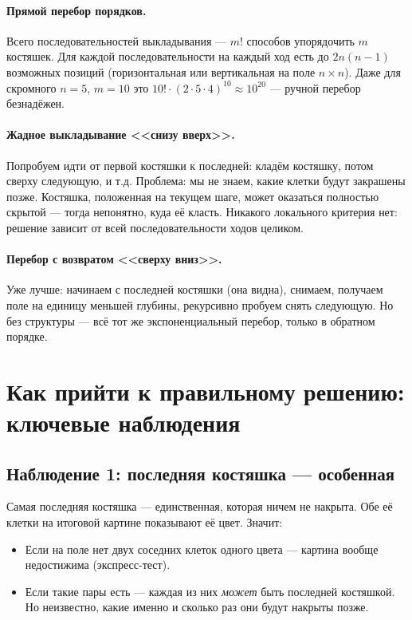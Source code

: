 \documentclass[12pt,a4paper]{article}
\begin{document}
\paragraph{Прямой перебор порядков.}
Всего последовательностей выкладывания --- $m!$ способов упорядочить
$m$ костяшек. Для каждой последовательности на каждый ход есть до
$2n(n-1)$ возможных позиций (горизонтальная или вертикальная на поле
$n\times n$). Даже для скромного $n=5$, $m=10$ это
$10! \cdot (2\cdot5\cdot4)^{10} \approx 10^{20}$ --- ручной перебор
безнадёжен.

\paragraph{Жадное выкладывание <<снизу вверх>>.}
Попробуем идти от первой костяшки к последней: кладём костяшку, потом
сверху следующую, и т.д. Проблема: мы не знаем, какие клетки будут
закрашены позже. Костяшка, положенная на текущем шаге, может оказаться
полностью скрытой --- тогда непонятно, куда её класть. Никакого
локального критерия нет: решение зависит от всей последовательности
ходов целиком.

\paragraph{Перебор с возвратом <<сверху вниз>>.}
Уже лучше: начинаем с последней костяшки (она видна), снимаем, получаем
поле на единицу меньшей глубины, рекурсивно пробуем снять следующую.
Но без структуры --- всё тот же экспоненциальный перебор, только в
обратном порядке.

\section{Как прийти к правильному решению: ключевые наблюдения}

\subsection{Наблюдение 1: последняя костяшка --- особенная}

Самая последняя костяшка --- единственная, которая ничем не накрыта.
Обе её клетки на итоговой картине показывают её цвет. Значит:
\begin{itemize}
  \item Если на поле нет двух соседних клеток одного цвета --- картина
        вообще недостижима (экспресс-тест).
  \item Если такие пары есть --- каждая из них \emph{может} быть
        последней костяшкой. Но неизвестно, какие именно и сколько раз
        они будут накрыты позже.
\end{itemize}
\end{document}
